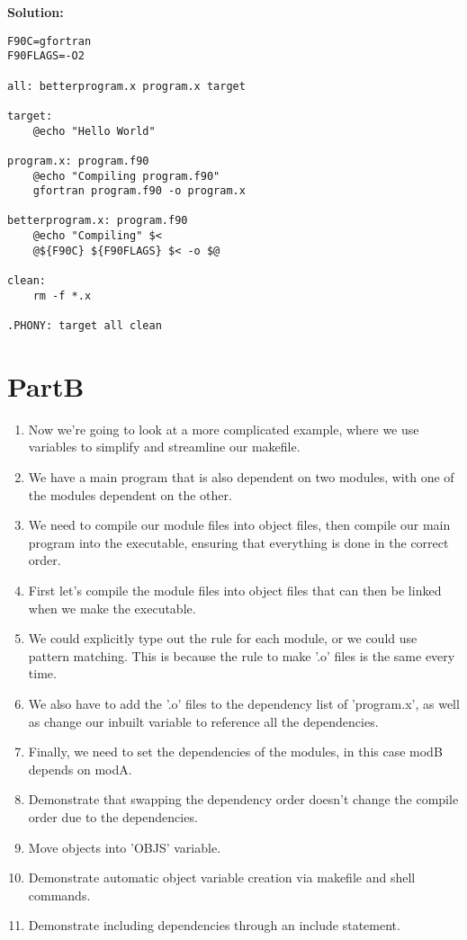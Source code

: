\documentclass{article}
\begin{document}
{\bf Solution:}
\begin{lstlisting}
F90C=gfortran
F90FLAGS=-O2

all: betterprogram.x program.x target

target:
	@echo "Hello World"

program.x: program.f90
	@echo "Compiling program.f90" 
	gfortran program.f90 -o program.x

betterprogram.x: program.f90
	@echo "Compiling" $<
	@${F90C} ${F90FLAGS} $< -o $@

clean:
	rm -f *.x

.PHONY: target all clean
\end{lstlisting}
\pagebreak
\section{PartB}
\begin{enumerate}
\item Now we're going to look at a more complicated example, where we use variables to simplify and streamline our makefile.
\item We have a main program that is also dependent on two modules, with one of the modules dependent on the other.
\item We need to compile our module files into object files, then compile our main program into the executable, ensuring that everything is done in the correct order.
\item First let's compile the module files into object files that can then be linked when we make the executable.
\item We could explicitly type out the rule for each module, or we could use pattern matching. This is because the rule to make '.o' files is the same every time.
\item We also have to add the '.o' files to the dependency list of 'program.x', as well as change our inbuilt variable to reference all the dependencies.
\item Finally, we need to set the dependencies of the modules, in this case modB depends on modA.
\item Demonstrate that swapping the dependency order doesn't change the compile order due to the dependencies.
\item Move objects into 'OBJS' variable.
\item Demonstrate automatic object variable creation via makefile and shell commands.
\item Demonstrate including dependencies through an include statement. 
\end{enumerate}
\end{document}
